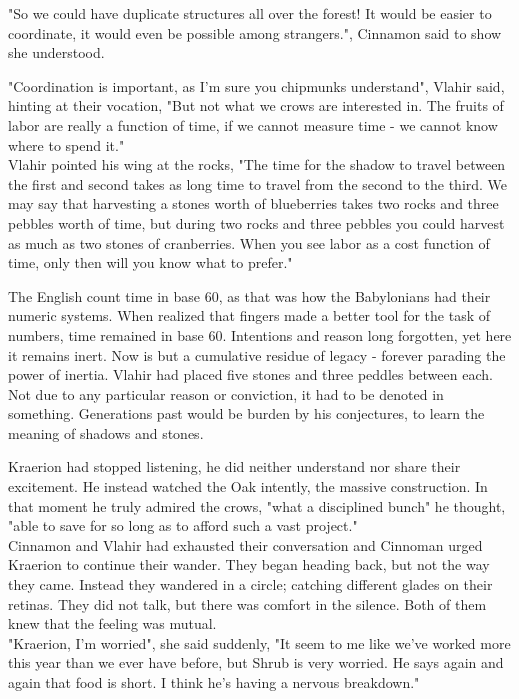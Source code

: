 \documentclass[smalldemyvopaper,11pt,twoside,onecolumn,openright,extrafontsizes]{memoir}
\begin{document}
"So we could have duplicate structures all over the forest! It would be easier to coordinate, it would even be possible among strangers.", Cinnamon said to show she understood. 

"Coordination is important, as I'm sure you chipmunks understand", Vlahir said, hinting at their vocation, "But not what we crows are interested in. The fruits of labor are really a function of time, if we cannot measure time - we cannot know where to spend it." \\ 

Vlahir pointed his wing at the rocks, "The time for the shadow to travel between the first and second takes as long time to travel from the second to the third. We may say that harvesting a stones worth of blueberries takes two rocks and three pebbles worth of time, but during two rocks and three pebbles you could harvest as much as two stones of cranberries. When you see labor as a cost function of time, only then will you know what to prefer."

The English count time in base 60, as that was how the Babylonians had their numeric systems. When realized that fingers made a better tool for the task of numbers, time remained in base 60. Intentions and reason long forgotten, yet here it remains inert. Now is but a cumulative residue of legacy - forever parading the power of inertia. Vlahir had placed five stones and three peddles between each. Not due to any particular reason or conviction, it had to be denoted in something. Generations past would be burden by his conjectures, to learn the meaning of shadows and stones. 

Kraerion had stopped listening, he did neither understand nor share their excitement. He instead watched the Oak intently, the massive construction. In that moment he truly admired the crows, "what a disciplined bunch" he thought, "able to save for so long as to afford such a vast project." \\

Cinnamon and Vlahir had exhausted their conversation and Cinnoman urged Kraerion to continue their wander. They began heading back, but not the way they came. Instead they wandered in a circle; catching different glades on their retinas. They did not talk, but there was comfort in the silence. Both of them knew that the feeling was mutual. \\

"Kraerion, I'm worried", she said suddenly, "It seem to me like we've worked more this year than we ever have before, but Shrub is very worried. He says again and again that food is short. I think he's having a nervous breakdown."
\end{document}
